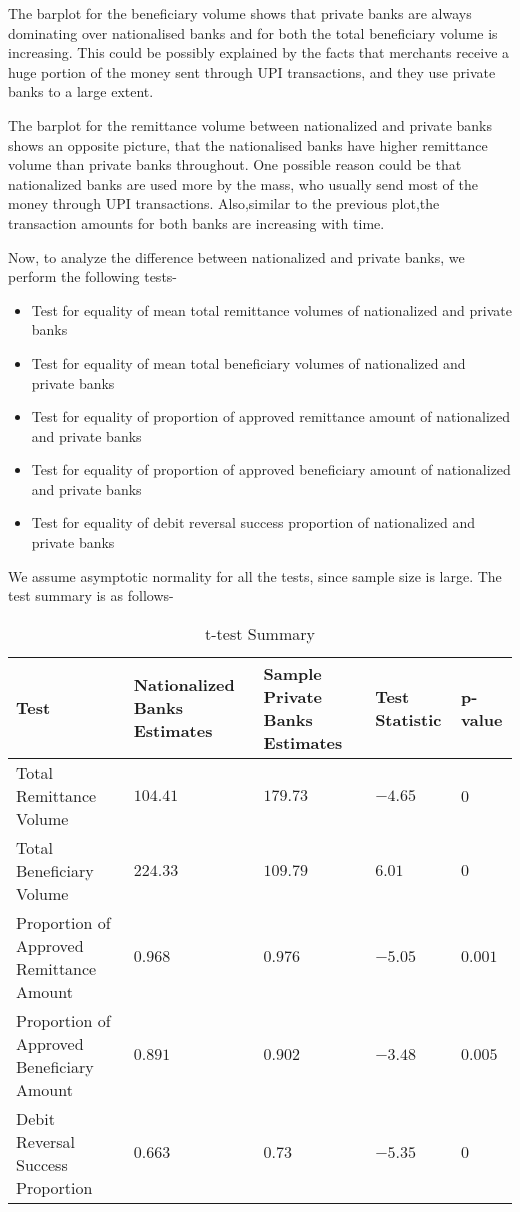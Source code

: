 \documentclass{article}
\begin{document}
The barplot for the beneficiary volume shows that private banks are always dominating over nationalised banks and for both the total beneficiary volume  is increasing. This could be possibly explained by the facts that merchants receive a huge portion of the money sent through UPI transactions, and they use private banks to a large extent.

The  barplot for the remittance volume between nationalized and private banks shows an opposite picture, that the nationalised banks have higher remittance volume than private banks throughout. One possible reason could be that nationalized banks are used more by the mass, who usually send most of the money through UPI transactions. Also,similar to the previous plot,the transaction amounts for both banks are increasing with time.


Now, to analyze the difference between nationalized and private banks, we perform the following tests-
\begin{itemize}
    \item Test for equality of mean total remittance volumes of nationalized and private banks
    \item Test for equality of mean total beneficiary volumes of nationalized and private banks
    \item Test for equality of proportion of approved remittance amount of nationalized and private banks
    \item Test for equality of proportion of approved beneficiary amount of nationalized and private banks
    \item Test for equality of debit reversal success proportion of nationalized and private banks
\end{itemize}

We assume asymptotic normality for all the tests, since sample size is large. The test summary is as follows-

\begin{table}[h]
\centering
\begin{tabular}{|p{6cm}|p{2cm}|p{2cm}|p{2cm}|p{2cm}|}
\hline
Test & Nationalized Banks Estimates & Sample Private Banks Estimates & Test Statistic & p-value \\
\hline
Total Remittance Volume & $104.41$ & $179.73$ & $-4.65$ & 0 \\
Total Beneficiary Volume & $224.33$ & $109.79$ & $6.01$ & $0$ \\
Proportion of Approved Remittance Amount & $0.968$ & $0.976$ & $-5.05$ & $0.001$ \\
Proportion of Approved Beneficiary Amount & $0.891$ & $0.902$ & $-3.48$ & $0.005$ \\
Debit Reversal Success Proportion & $0.663$ & $0.73$ & $-5.35$ & $0$ \\
\hline
\end{tabular}
\caption{t-test Summary}
\label{tab:summary_table}
\end{table}
\end{document}
